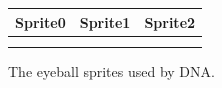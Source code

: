 







\begin{figure}[H]
  {
    \setlength{\tabcolsep}{1.0pt}
    \setlength\cmidrulewidth{\heavyrulewidth} %
    \begin{adjustbox}{width=14cm,center}
      \begin{tabular}{ccc}
        \toprule
        Sprite0 & Sprite1 & Sprite2 \\
        \midrule
\makecell[l]{
	\begin{subfigure}{0.3\textwidth}
    \def\MULTICOLORONE{red}
    \def\MULTICOLORTWO{white}
    \def\SPRITECOLOR{yellow}
		
	\end{subfigure}
} &
\makecell[l]{
	\begin{subfigure}{0.3\textwidth}
    \def\MULTICOLORONE{red}
    \def\MULTICOLORTWO{white}
    \def\SPRITECOLOR{green}
		
	\end{subfigure}
} &
\makecell[l]{
	\begin{subfigure}{0.3\textwidth}
    \def\MULTICOLORONE{red}
    \def\MULTICOLORTWO{white}
    \def\SPRITECOLOR{lightblue}
		
	\end{subfigure}
} \\ 
        \addlinespace
        \bottomrule
      \end{tabular}
    \end{adjustbox}
  }\caption{The eyeball sprites used by DNA.}
\end{figure}
